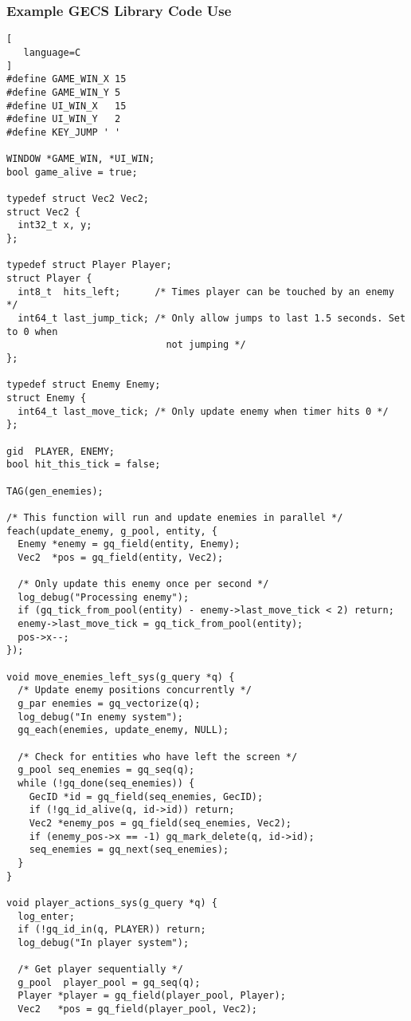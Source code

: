 \subsubsection{Example GECS Library Code Use}
\label{appendix:code_example_1}
\begin{lstlisting}[
   language=C
]
#define GAME_WIN_X 15
#define GAME_WIN_Y 5
#define UI_WIN_X   15
#define UI_WIN_Y   2
#define KEY_JUMP ' '

WINDOW *GAME_WIN, *UI_WIN;
bool game_alive = true;

typedef struct Vec2 Vec2;
struct Vec2 {
  int32_t x, y;
};

typedef struct Player Player;
struct Player {
  int8_t  hits_left;      /* Times player can be touched by an enemy */
  int64_t last_jump_tick; /* Only allow jumps to last 1.5 seconds. Set to 0 when
                            not jumping */
};

typedef struct Enemy Enemy;
struct Enemy {
  int64_t last_move_tick; /* Only update enemy when timer hits 0 */
};

gid  PLAYER, ENEMY;
bool hit_this_tick = false;

TAG(gen_enemies);

/* This function will run and update enemies in parallel */
feach(update_enemy, g_pool, entity, {
  Enemy *enemy = gq_field(entity, Enemy);
  Vec2  *pos = gq_field(entity, Vec2);

  /* Only update this enemy once per second */
  log_debug("Processing enemy");
  if (gq_tick_from_pool(entity) - enemy->last_move_tick < 2) return;
  enemy->last_move_tick = gq_tick_from_pool(entity);
  pos->x--;
});

void move_enemies_left_sys(g_query *q) {
  /* Update enemy positions concurrently */
  g_par enemies = gq_vectorize(q);
  log_debug("In enemy system");
  gq_each(enemies, update_enemy, NULL);

  /* Check for entities who have left the screen */
  g_pool seq_enemies = gq_seq(q);
  while (!gq_done(seq_enemies)) {
    GecID *id = gq_field(seq_enemies, GecID);
    if (!gq_id_alive(q, id->id)) return;
    Vec2 *enemy_pos = gq_field(seq_enemies, Vec2);
    if (enemy_pos->x == -1) gq_mark_delete(q, id->id);
    seq_enemies = gq_next(seq_enemies);
  }
}

void player_actions_sys(g_query *q) {
  log_enter;
  if (!gq_id_in(q, PLAYER)) return;
  log_debug("In player system");

  /* Get player sequentially */
  g_pool  player_pool = gq_seq(q);
  Player *player = gq_field(player_pool, Player);
  Vec2   *pos = gq_field(player_pool, Vec2);


\end{lstlisting}

